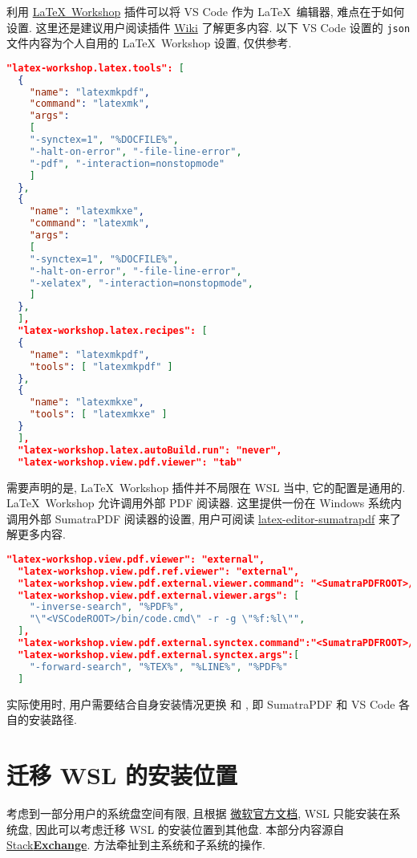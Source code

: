 利用
\href{https://marketplace.visualstudio.com/items?itemName=James-Yu.latex-workshop}{\LaTeX\ Workshop}
插件可以将 VS Code 作为 \LaTeX\ 编辑器,
难点在于如何设置.
这里还是建议用户阅读插件
\href{https://github.com/James-Yu/LaTeX-Workshop/wiki}{Wiki}
了解更多内容.
以下 VS Code 设置的 \texttt{json} 文件内容为个人自用的 \LaTeX\ Workshop 设置,
仅供参考.
\begin{lstlisting}[language = json]
  "latex-workshop.latex.tools": [
  {
    "name": "latexmkpdf",
    "command": "latexmk",
    "args":
    [
    "-synctex=1", "%DOCFILE%",
    "-halt-on-error", "-file-line-error",
    "-pdf", "-interaction=nonstopmode"
    ]
  },
  {
    "name": "latexmkxe",
    "command": "latexmk",
    "args":
    [
    "-synctex=1", "%DOCFILE%",
    "-halt-on-error", "-file-line-error",
    "-xelatex", "-interaction=nonstopmode",
    ]
  },
  ],
  "latex-workshop.latex.recipes": [
  {
    "name": "latexmkpdf",
    "tools": [ "latexmkpdf" ]
  },
  {
    "name": "latexmkxe",
    "tools": [ "latexmkxe" ]
  }
  ],
  "latex-workshop.latex.autoBuild.run": "never",
  "latex-workshop.view.pdf.viewer": "tab"
\end{lstlisting}

需要声明的是,
\LaTeX\ Workshop 插件并不局限在 WSL 当中,
它的配置是通用的.
\LaTeX\ Workshop 允许调用外部 PDF 阅读器.
这里提供一份在 Windows 系统内调用外部 SumatraPDF 阅读器的设置,
用户可阅读
\href{https://github.com/OsbertWang/latex-editor-sumatrapdf}{\textsf{latex-editor-sumatrapdf}}
来了解更多内容.
\begin{lstlisting}[language = json]
  "latex-workshop.view.pdf.viewer": "external",
  "latex-workshop.view.pdf.ref.viewer": "external",
  "latex-workshop.view.pdf.external.viewer.command": "<SumatraPDFROOT>/SumatraPDF.exe",
  "latex-workshop.view.pdf.external.viewer.args": [
    "-inverse-search", "%PDF%",
    "\"<VSCodeROOT>/bin/code.cmd\" -r -g \"%f:%l\"",
  ],
  "latex-workshop.view.pdf.external.synctex.command":"<SumatraPDFROOT>/SumatraPDF.exe",
  "latex-workshop.view.pdf.external.synctex.args":[
    "-forward-search", "%TEX%", "%LINE%", "%PDF%"
  ]
\end{lstlisting}
实际使用时,
用户需要结合自身安装情况更换  和 ,
即 SumatraPDF 和 VS Code 各自的安装路径.

\section{迁移 WSL 的安装位置}

考虑到一部分用户的系统盘空间有限,
且根据%
\href{https://learn.microsoft.com/zh-cn/windows/wsl/troubleshooting?source=recommendations#installation-issues}{微软官方文档},
WSL 只能安装在系统盘,
因此可以考虑迁移 WSL 的安装位置到其他盘.
本部分内容源自
\href{https://superuser.com/questions/1701175/installing-ubuntu-on-mnt-d-with-wsl}{\textsf{Stack\textbf{Exchange}}}.
方法牵扯到主系统和子系统的操作.

